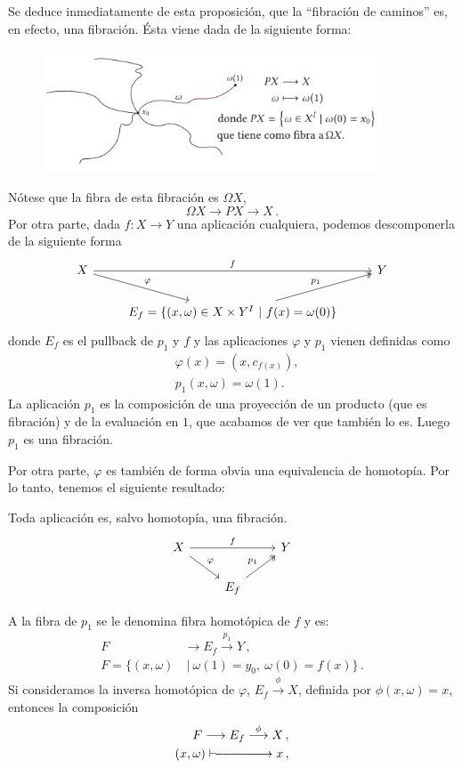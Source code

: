 Se deduce inmediatamente de esta proposición, que la ``fibración de caminos'' es, en efecto, una fibración. Ésta viene dada de la siguiente forma: \par
\begin{figure}[h]
\centering
\includegraphics[width = 0.9\textwidth]{images/fibraccaminos}
\end{figure}
Nótese que la fibra de esta fibración es $\Omega X$,
\[ \Omega X \longrightarrow PX \longrightarrow X \, . \]
Por otra parte, dada $f: X \longrightarrow Y$ una aplicación cualquiera, podemos descomponerla de la siguiente forma
\[
\begin{tikzcd}
X \arrow{rr}{f} \drar{\varphi} & & Y \\
 & E_f = \{ (x, \omega ) \in X \times Y^I \ \vert \ f(x) = \omega(0) \} \urar[twoheadrightarrow]{p_1} &
\end{tikzcd}
\]
donde $E_f$ es el pullback de $p_1$ y $f$ y las aplicaciones $\varphi$ y $p_1$ vienen definidas como 
\begin{align*}
&\varphi(x) = (x, c_{f(x)}), \\
&p_1(x, \omega) = \omega(1).
\end{align*}
La aplicación $p_1$ es la composición de una proyección de un producto (que es fibración) y de la evaluación en $1$, que acabamos de ver que también lo es. Luego $p_1$ es una fibración. \par 
Por otra parte, $\varphi$ es también de forma obvia una equivalencia de homotopía. Por lo tanto, tenemos el siguiente resultado:
\begin{teorf}
Toda aplicación es, salvo homotopía, una fibración. 
\[
\begin{tikzcd}
X \arrow{rr}{f} \drar{\varphi} & & Y \\
 & E_f  \urar[twoheadrightarrow]{p_1} &
\end{tikzcd}
\]
\end{teorf}
A la fibra de $p_1$ se le denomina fibra homotópica de $f$ y es:
\begin{align*}
F &\longrightarrow E_f \stackrel{p_1}{\longrightarrow} Y \, , \\
F = \{ (x, \omega) & \ \vert \ \omega(1) = y_0, \ \omega(0) = f(x) \} \, .
\end{align*}
Si consideramos la inversa homotópica de $\varphi$, $E_f \stackrel{\phi}{\longrightarrow} X$, definida por $\phi(x, \omega) = x$, entonces la composición 
\begin{align*}
F \longrightarrow E_f \stackrel{\phi}{\longrightarrow} X \, , \\
(x, \omega) \vdash\joinrel\relbar\joinrel\relbar\joinrel\relbar\joinrel\relbar\joinrel\relbar\joinrel\relbar\joinrel\rightarrow x \, ,
\end{align*}

